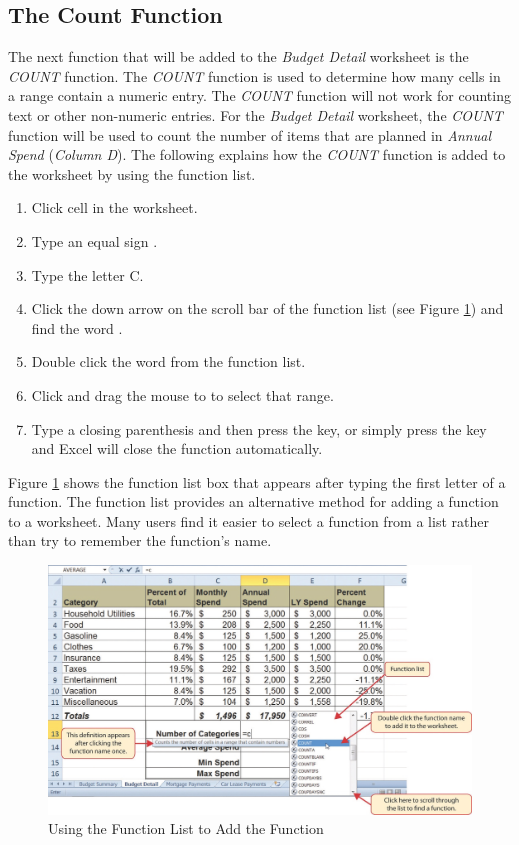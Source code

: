 \subsection{The Count Function}

The next function that will be added to the \textit{Budget Detail} worksheet is the \textit{COUNT} function. The \textit{COUNT} function is used to determine how many cells in a range contain a numeric entry. The \textit{COUNT} function will not work for counting text or other non-numeric entries. For the \textit{Budget Detail} worksheet, the \textit{COUNT} function will be used to count the number of items that are planned in \textit{Annual Spend} (\textit{Column D}). The following explains how the \textit{COUNT} function is added to the worksheet by using the function list.

\begin{enumerate}
	\item Click cell  in the  worksheet.
	\item Type an equal sign \fmtTyping{=}.
	\item Type the letter C.
	\item Click the down arrow on the scroll bar of the function list (see Figure \ref{02:fig17}) and find the word .
	\item Double click the word  from the function list.
	\item Click  and drag the mouse to  to select that range.
	\item Type a closing parenthesis \fmtTyping{)} and then press the  key, or simply press the  key and Excel will close the function automatically.
\end{enumerate}

Figure \ref{02:fig17} shows the function list box that appears after typing the first letter of a function. The function list provides an alternative method for adding a function to a worksheet. Many users find it easier to select a function from a list rather than try to remember the function's name.

\begin{figure}[H]
	\centering
	\includegraphics[width=\maxwidth{.95\linewidth}]{gfx/ch02_fig17}
	\caption{Using the Function List to Add the  Function}
	\label{02:fig17}
\end{figure}

